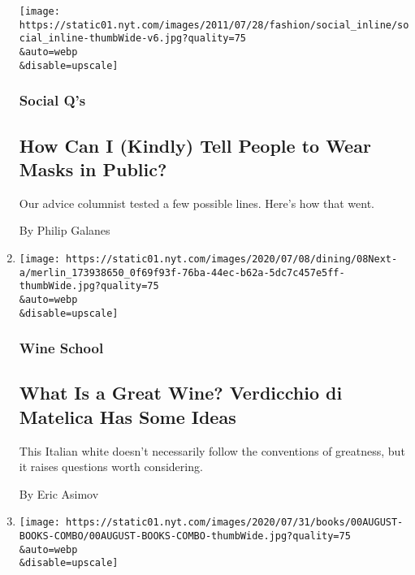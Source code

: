 \begin{enumerate}
  \texttt{[image: https://static01.nyt.com/images/2011/07/28/fashion/social\_inline/social\_inline-thumbWide-v6.jpg?quality=75\\\&auto=webp\\\&disable=upscale]}

  \hypertarget{social-qs}{%
  \subsubsection{Social Q's}\label{social-qs}}

  \hypertarget{how-can-i-kindly-tell-people-to-wear-masks-in-public}{%
  \subsection{How Can I (Kindly) Tell People to Wear Masks in
  Public?}\label{how-can-i-kindly-tell-people-to-wear-masks-in-public}}

  Our advice columnist tested a few possible lines. Here's how that
  went.

  By Philip Galanes
\item
  \href{/2020/07/30/dining/drinks/wine-school-verdicchio-di-matelica.html}{}

  \texttt{[image: https://static01.nyt.com/images/2020/07/08/dining/08Next-a/merlin\_173938650\_0f69f93f-76ba-44ec-b62a-5dc7c457e5ff-thumbWide.jpg?quality=75\\\&auto=webp\\\&disable=upscale]}

  \hypertarget{wine-school}{%
  \subsubsection{Wine School}\label{wine-school}}

  \hypertarget{what-is-a-great-wine-verdicchio-di-matelica-has-some-ideas}{%
  \subsection{What Is a Great Wine? Verdicchio di Matelica Has Some
  Ideas}\label{what-is-a-great-wine-verdicchio-di-matelica-has-some-ideas}}

  This Italian white doesn't necessarily follow the conventions of
  greatness, but it raises questions worth considering.

  By Eric Asimov
\item
  \href{/2020/07/30/books/new-august-books.html}{}

  \texttt{[image: https://static01.nyt.com/images/2020/07/31/books/00AUGUST-BOOKS-COMBO/00AUGUST-BOOKS-COMBO-thumbWide.jpg?quality=75\\\&auto=webp\\\&disable=upscale]}


\end{enumerate}
